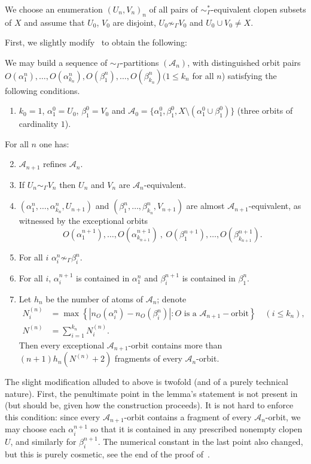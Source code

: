 \documentclass[AHL,Unicode]{cedram}
\newcommand{\mcA}{\mathcal{A}}
\begin{document}
We choose an enumeration $(U_n,V_n)_n$ of all pairs of $\sim_\Gamma^*$-equivalent clopen subsets of $X$ and assume that $U_0$, $V_0$ are disjoint, $U_0 \not \sim_\Gamma V_0$ and $U_0 \cup V_0 \neq X$.

First, we slightly modify~\cite[Lemma~5.3]{Melleray2023} to obtain the following:

\begin{lemm}\label{l:main_construction}
We may build a sequence of $\sim_\Gamma$-partitions $(\mcA_n)$, with distinguished orbit pairs $O(\alpha_1^n),\dots,O(\alpha_{k_n}^n), O(\beta_1^n), \dots, O(\beta_{k_n}^n) (1 \le k_n$ for all $n$) satisfying the following conditions.
\begin{enumerate}
\item $k_0=1$, $\alpha_1^0=U_0$, $\beta_1^0=V_0$ and $\mcA_0 = \{\alpha_1^0,\beta_1^0,X \setminus (\alpha_1^0 \cup \beta_1^0)\}$ (three orbits of cardinality $1$).
\end{enumerate}
For all $n$ one has:
\begin{enumerate}
\setcounter{enumi}{1}
\item $\mcA_{n+1}$ refines $\mcA_n$.
\item If $U_n \sim_\Gamma V_n$ then $U_n$ and $V_n$ are $\mcA_n$-equivalent.
\item $(\alpha_1^n,\dots,\alpha_{k_n}^n, U_{n+1})$ and $(\beta_1^n,\dots,\beta_{k_n}^n,V_{n+1})$ are almost $\mcA_{n+1}$-equivalent, as witnessed by the exceptional orbits
\[
O(\alpha_1^{n+1}),\dots,O(\alpha_{k_{n+1}}^{n+1}) \ , \ O(\beta_1^{n+1}),\dots,O(\beta_{k_{n+1}}^{n+1}).
\]
\item For all $i$ $\alpha_i^n \not \sim_\Gamma \beta_i^n$.
\item For all $i$, $\alpha_i^{n+1}$ is contained in $\alpha_1^n$ and $\beta_i^{n+1}$ is contained in $\beta_1^n$.
\item Let $h_n$ be the number of atoms of $\mcA_n$; denote
\begin{align*}
N^{(n)}_i&= \max\left\{|n_O(\alpha^n_i) - n_O(\beta^n_i)| : O \text{ is a } \mcA_{n+1}-\text{orbit} \right\} \quad (i \le k_n), \\
N^{(n)} &= \sum_{i=1}^{k_n} N^{(n)}_i.
\end{align*}
Then every exceptional $\mcA_{n+1}$-orbit contains more than $(n+1) h_n (N^{(n)}+2)$ fragments of every $\mcA_n$-orbit.
\end{enumerate}
\end{lemm}

The slight modification alluded to above is twofold (and of a purely technical nature). First, the penultimate point in the lemma's statement is not present in~\cite{Melleray2023} (but should be, given how the construction proceeds). It is not hard to enforce this condition: since every $\mcA_{n+1}$-orbit contains a fragment of every $\mcA_n$-orbit, we may choose each $\alpha_i^{n+1}$ so that it is contained in any prescribed nonempty clopen $U$, and similarly for $\beta_i^{n+1}$. The numerical constant in the last point also changed, but this is purely cosmetic, see the end of the proof of~\cite[Proposition~4.10]{Melleray2023}.
\end{document}
